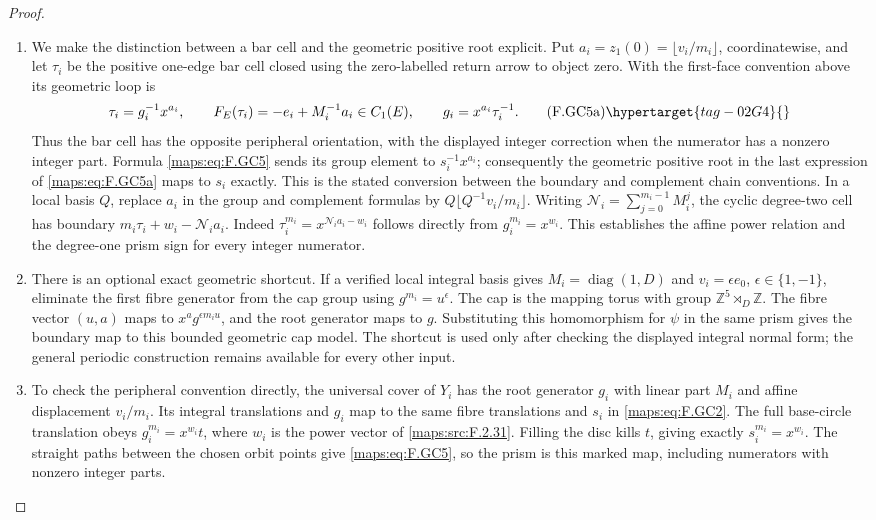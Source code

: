 \begin{proof}
\begin{enumerate}[label={$\langle1\rangle$\arabic*.}]
\item We make the distinction between a bar cell and the geometric
positive root explicit.  Put
$a_i=z_1(0)=\lfloor v_i/m_i\rfloor$, coordinatewise, and
let $\tau_i$ be the positive one-edge bar cell closed using
the zero-labelled return arrow to object zero.  With the
first-face convention above its geometric loop is
\[
 \tau_i=g_i^{-1}x^{a_i},\qquad
 F_E(\tau_i)=-e_i+M_i^{-1}a_i\in C_1(E),\qquad
 g_i=x^{a_i}\tau_i^{-1}.                                  \tag{F.GC5a}\hypertarget{tag-02G4}{}\label{maps:eq:F.GC5a}
\]
Thus the bar cell has the opposite peripheral orientation,
with the displayed integer correction when the numerator
has a nonzero integer part.  Formula \eqref{maps:eq:F.GC5} sends its
group element to $s_i^{-1}x^{a_i}$; consequently the
geometric positive root in the last expression of \eqref{maps:eq:F.GC5a}
maps to $s_i$ exactly.  This is the stated conversion between
the boundary and complement chain conventions.  In a local basis
$Q$, replace $a_i$ in the group and complement formulas by
$Q\lfloor Q^{-1}v_i/m_i\rfloor$.
Writing $\mathcal N_i=\sum_{j=0}^{m_i-1}M_i^j$, the cyclic
degree-two cell has boundary
$m_i\tau_i+w_i-\mathcal N_i a_i$.
Indeed $\tau_i^{m_i}=x^{\mathcal N_i a_i-w_i}$ follows
directly from $g_i^{m_i}=x^{w_i}$.
This establishes the affine power relation and the degree-one
prism sign for every integer numerator.

\item There is an optional exact geometric shortcut.  If a verified
local integral basis gives $M_i=\operatorname{diag}(1,D)$ and
$v_i=\epsilon e_0$, $\epsilon\in\{1,-1\}$, eliminate the
first fibre generator from the cap group using
$g^{m_i}=u^\epsilon$.  The cap is the mapping torus with
group $\mathbb Z^5\rtimes_D\mathbb Z$.
The fibre vector $(u,a)$ maps to $x^a g^{\epsilon m_i u}$,
and the root generator maps to $g$.  Substituting this
homomorphism for $\psi$ in the same prism gives the boundary
map to this bounded geometric cap model.  The shortcut is
used only after checking the displayed integral normal form;
the general periodic construction remains available for
every other input.

\item To check the peripheral convention directly, the universal
cover of $Y_i$ has the root generator $g_i$ with linear part
$M_i$ and affine displacement $v_i/m_i$.  Its integral
translations and $g_i$ map to the same fibre translations
and $s_i$ in \eqref{maps:eq:F.GC2}.  The full base-circle translation obeys
$g_i^{m_i}=x^{w_i}t$, where $w_i$ is the power vector of
\ref{maps:src:F.2.31}.  Filling the disc kills $t$, giving exactly
$s_i^{m_i}=x^{w_i}$.  The straight paths between the chosen
orbit points give \eqref{maps:eq:F.GC5}, so the prism is this marked map,
including numerators with nonzero integer parts.


\end{enumerate}
\end{proof}

